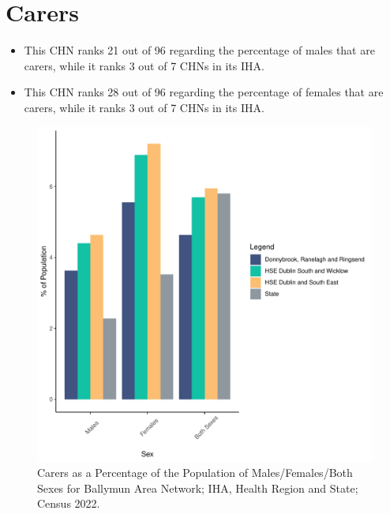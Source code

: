\documentclass{article}
\begin{document}
\section{Carers}\label{sect:Carers}
\begin{itemize}
\item This CHN ranks  21 out of 96 regarding the percentage of males that are carers, while it ranks   3 out of 7 CHNs in its IHA.
\item This CHN ranks  28 out of 96 regarding the percentage of females that are carers, while it ranks   3 out of 7 CHNs in its IHA.
\end{itemize}
\begin{figure}[H]
	\centering
	\includegraphics[width = 150mm]{../figures/CareED.pdf}
	\caption{Carers as a Percentage of the Population of Males/Females/Both Sexes for Ballymun Area Network; IHA, Health Region and State; Census 2022.}
	\label{fig:2ae19629-1a6a-13a3-e055-000000000001}
	\end{figure}
\end{document}
